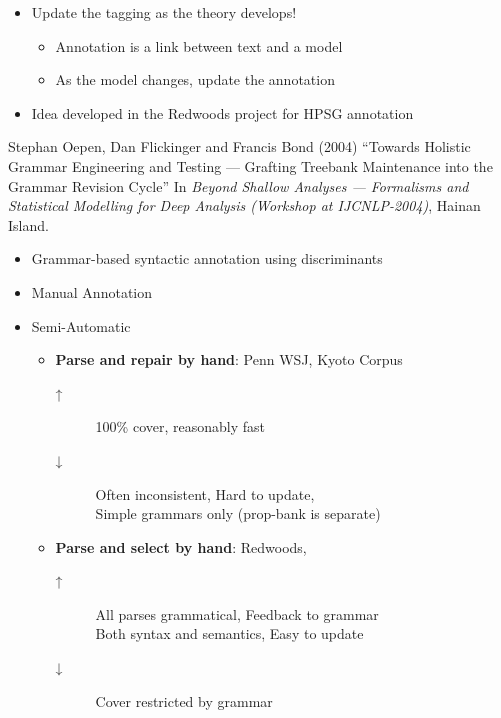 \documentclass[a4paper,landscape,headrule,footrule,xetex]{foils}
\begin{document}

\begin{itemize}
\item Update the tagging as the theory develops!
  \begin{itemize}
  \item Annotation is a link between text and a model
  \item As the model changes, update the annotation
  \end{itemize}
\item Idea developed in the Redwoods project for HPSG annotation
\end{itemize}

Stephan Oepen, Dan Flickinger and Francis Bond (2004)
     ``Towards Holistic Grammar Engineering and Testing --- Grafting Treebank Maintenance into the Grammar Revision Cycle'' In \textit{Beyond Shallow Analyses --- Formalisms and Statistical Modelling for Deep Analysis (Workshop at IJCNLP-2004)}, Hainan Island. 



\begin{itemize}
\item Grammar-based syntactic annotation using discriminants
\end{itemize}


\begin{itemize}
\item Manual Annotation
\item Semi-Automatic 
  \begin{itemize}
  \item \textbf{Parse and repair by hand}: Penn WSJ, Kyoto Corpus
    \begin{description}
    \item [↑] 100\% cover, reasonably fast
    \item [↓] Often inconsistent, Hard to update,   \\
      Simple grammars only (prop-bank is separate)
    \end{description}
  \item \textbf{Parse and select by hand}: Redwoods, 
    \begin{description}
    \item [↑] All parses grammatical, Feedback to grammar
      \\ Both syntax and semantics, Easy to update
    \item [↓] Cover restricted by grammar
    \end{description}
  \end{itemize}
\end{itemize}
\end{document}
